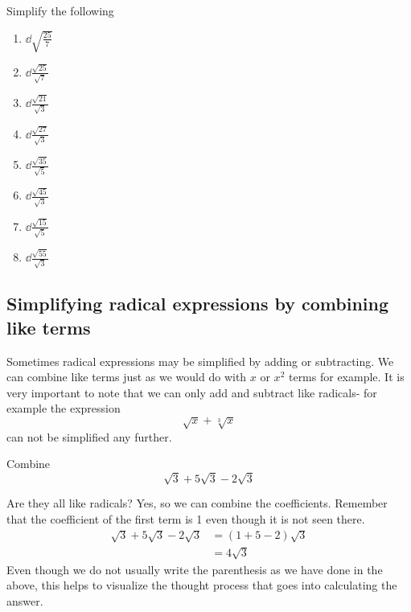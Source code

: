 \begin{myexample}
Simplify the following
\drillandskill
\end{myexample}
\begin{multicols}{2}
	\begin{enumerate}
		\item $\dd\sqrt{\frac{25}{7}}$ 
		\item $\dd\frac{\sqrt{25}}{\sqrt{7}}$ 
		\item $\dd\frac{\sqrt{21}}{\sqrt{3}}$ 
		\item $\dd\frac{\sqrt{27}}{\sqrt{3}}$ 
		\item $\dd\frac{\sqrt{35}}{\sqrt{5}}$ 
		\item $\dd\frac{\sqrt{45}}{\sqrt{3}}$ 
		\item $\dd\frac{\sqrt{15}}{\sqrt{5}}$ 
		\item $\dd\frac{\sqrt{55}}{\sqrt{3}}$ 
	\end{enumerate}
\end{multicols}

\subsection{Simplifying radical expressions by combining like terms}
Sometimes radical expressions may be simplified by adding or subtracting. We can combine like
terms just as we would do with $x$ or $x^2$ terms for example. It is very important to note
that we can only add and subtract like radicals- for example the \gls{expression}
\[
	\sqrt{x}+ \sqrt[3]{x}
\]
can not be simplified any further.

\begin{myexample}
Combine
\[
	\sqrt{3}+5\sqrt{3} -2\sqrt{3}
\]
\end{myexample}
\begin{myProof}
	Are they all like radicals? Yes, so we can combine the coefficients. Remember that the \gls{coefficient}
	of the first term is 1 even though it is not seen there.
	\begin{align*}
		\sqrt{3}+5\sqrt{3}-2\sqrt{3} & =  (1+5-2)\sqrt{3} \\
		                             & =  4\sqrt{3}       
	\end{align*} 
	Even though we do not usually write the parenthesis as we have done in the above, this helps to 
	visualize the thought process that goes into calculating the answer. 
\end{myProof} 


